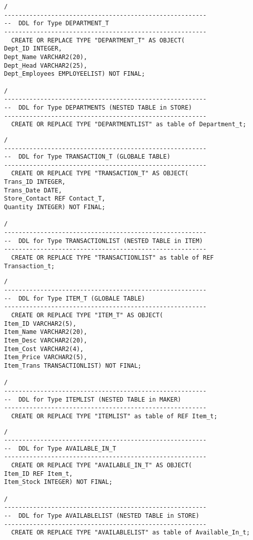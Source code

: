 \documentclass{scrartcl}
\begin{document}
\begin{lstlisting}
/
--------------------------------------------------------
--  DDL for Type DEPARTMENT_T
--------------------------------------------------------
  CREATE OR REPLACE TYPE "DEPARTMENT_T" AS OBJECT(
Dept_ID INTEGER,
Dept_Name VARCHAR2(20),
Dept_Head VARCHAR2(25),
Dept_Employees EMPLOYEELIST) NOT FINAL;

/
--------------------------------------------------------
--  DDL for Type DEPARTMENTS (NESTED TABLE in STORE)
--------------------------------------------------------
  CREATE OR REPLACE TYPE "DEPARTMENTLIST" as table of Department_t;
\end{lstlisting}

\begin{lstlisting}
/
--------------------------------------------------------
--  DDL for Type TRANSACTION_T (GLOBALE TABLE)
--------------------------------------------------------
  CREATE OR REPLACE TYPE "TRANSACTION_T" AS OBJECT(
Trans_ID INTEGER,
Trans_Date DATE,
Store_Contact REF Contact_T,
Quantity INTEGER) NOT FINAL;

/
--------------------------------------------------------
--  DDL for Type TRANSACTIONLIST (NESTED TABLE in ITEM)
--------------------------------------------------------
  CREATE OR REPLACE TYPE "TRANSACTIONLIST" as table of REF Transaction_t;
\end{lstlisting}

\begin{lstlisting}
/
--------------------------------------------------------
--  DDL for Type ITEM_T (GLOBALE TABLE)
--------------------------------------------------------
  CREATE OR REPLACE TYPE "ITEM_T" AS OBJECT(
Item_ID VARCHAR2(5),
Item_Name VARCHAR2(20),
Item_Desc VARCHAR2(20),
Item_Cost VARCHAR2(4),
Item_Price VARCHAR2(5),
Item_Trans TRANSACTIONLIST) NOT FINAL; 

/
--------------------------------------------------------
--  DDL for Type ITEMLIST (NESTED TABLE in MAKER)
--------------------------------------------------------
  CREATE OR REPLACE TYPE "ITEMLIST" as table of REF Item_t;
\end{lstlisting}

\begin{lstlisting}
/
--------------------------------------------------------
--  DDL for Type AVAILABLE_IN_T
--------------------------------------------------------
  CREATE OR REPLACE TYPE "AVAILABLE_IN_T" AS OBJECT(
Item_ID REF Item_t,
Item_Stock INTEGER) NOT FINAL;

/
--------------------------------------------------------
--  DDL for Type AVAILABLELIST (NESTED TABLE in STORE)
--------------------------------------------------------
  CREATE OR REPLACE TYPE "AVAILABLELIST" as table of Available_In_t;
\end{lstlisting}
\end{document}
